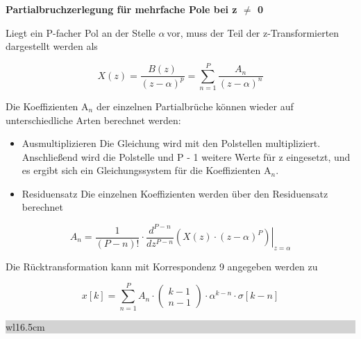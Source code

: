{\selectfont
\noindent\textbf{Partialbruchzerlegung f\"{u}r mehrfache Pole bei z $\boldsymbol{\mathrm{\neq}}$ 0}}\smallskip

\noindent Liegt ein P-facher Pol an der Stelle $\alpha_{\ }$vor, muss der Teil der z-Transformierten dargestellt werden als 

\begin{equation}\label{eq:fiveonehundredfour}
X\left(z\right)=\frac{B\left(z\right)}{\left(z-\alpha \right)^{p} } =\sum _{n=1}^{P}\frac{A_{n} }{\left(z-\alpha \right)^{n} }
\end{equation}

\noindent Die Koeffizienten A${}_{n}$ der einzelnen Partialbr\"{u}che k\"{o}nnen wieder auf unterschiedliche Arten berechnet werden:

\begin{itemize}
    \item Ausmultiplizieren \newline
    Die Gleichung wird mit den Polstellen multipliziert. Anschlie{\ss}end wird die Polstelle und P - 1 weitere Werte f\"{u}r z eingesetzt, und es ergibt sich ein Gleichungssystem f\"{u}r die Koeffizienten A${}_{n}$. 
    \item Residuensatz \newline
    Die einzelnen Koeffizienten werden \"{u}ber den Residuensatz berechnet
\end{itemize}

\begin{equation}\label{eq:fiveonehundredfive}
A_{n} =\frac{1}{\left(P-n\right)!} \cdot \frac{d^{P-n} }{dz^{P-n} } \left. \left(X\left(z\right)\cdot \left(z-\alpha \right)^{P} \right)\right|_{z=\alpha }
\end{equation}

\noindent Die R\"{u}cktransformation kann mit Korrespondenz 9 angegeben werden zu

\begin{equation}\label{eq:fiveonehundredsix}
x\left[k\right]=\sum _{n=1}^{P}A_{n} \cdot \left(\begin{array}{c} {k-1} \\ {n-1} \end{array}\right)\cdot \alpha ^{k-n} \cdot \sigma \left[k-n\right]
\end{equation}\bigskip

\noindent
\colorbox{lightgray}{%
%
\renewcommand\arraystretch{0.6}%
\begin{tabular}{ wl{16.5cm} }
{}
\end{tabular}%
}\medskip

